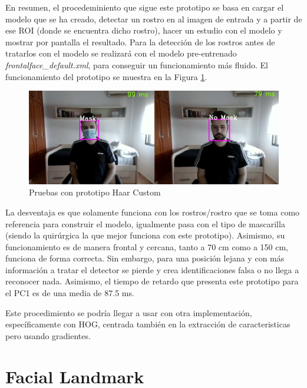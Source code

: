 En resumen, el procedeminiento que sigue este prototipo se basa en cargar el modelo que se ha creado, detectar un rostro en al imagen de entrada y a partir de ese ROI (donde se encuentra dicho rostro), hacer un estudio con el modelo y mostrar por pantalla el resultado. Para la detección de los rostros antes de tratarlos con el modelo se realizará con el modelo pre-entrenado \textit{frontalface\_default.xml}, para conseguir un funcionamiento más fluido. El funcionamiento del prototipo se muestra en la Figura \ref{fig:haarCustom}.

\begin{figure}[htp]
	\centering
	\includegraphics[width=15cm]{imagenes/haarcustom_prueba.png}
	\caption{Pruebas con prototipo Haar Custom}
	\label{fig:haarCustom}
\end{figure}

La desventaja es que solamente funciona con los rostros/rostro que se toma como referencia para construir el modelo, igualmente pasa con el tipo de mascarilla (siendo la quirúrgica la que mejor funciona con este prototipo). Asimismo, su funcionamiento es de manera frontal y cercana, tanto a 70 cm como a 150 cm, funciona de forma correcta. Sin embargo, para una posición lejana y con más información a tratar el detector se pierde y crea identificaciones falsa o no llega a reconocer nada. Asimismo, el tiempo de retardo que presenta este prototipo para el PC1 es de una media de 87.5 ms.

Este procedimiento se podría llegar a usar con otra implementación, específicamente con HOG, centrada también en la extracción de caracteristicas pero usando gradientes.

\newpage
\section{Facial Landmark}

